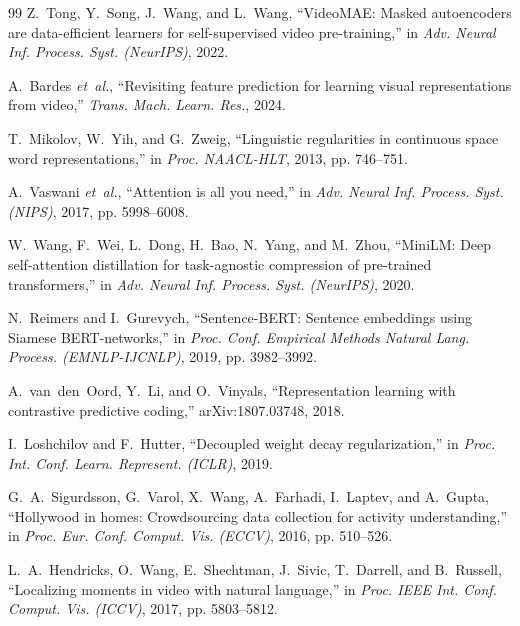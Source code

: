 \documentclass[lettersize,journal]{IEEEtran}
\begin{document}
\begin{thebibliography}{99}
Z.~Tong, Y.~Song, J.~Wang, and L.~Wang, ``VideoMAE: Masked autoencoders are
data-efficient learners for self-supervised video pre-training,'' in
\textit{Adv. Neural Inf. Process. Syst. (NeurIPS)}, 2022.

A.~Bardes \textit{et~al.}, ``Revisiting feature prediction for learning
visual representations from video,'' \textit{Trans. Mach. Learn. Res.}, 2024.

T.~Mikolov, W.~Yih, and G.~Zweig, ``Linguistic regularities in continuous
space word representations,'' in \textit{Proc. NAACL-HLT}, 2013,
pp. 746--751.

A.~Vaswani \textit{et~al.}, ``Attention is all you need,'' in \textit{Adv.
Neural Inf. Process. Syst. (NIPS)}, 2017, pp. 5998--6008.

W.~Wang, F.~Wei, L.~Dong, H.~Bao, N.~Yang, and M.~Zhou, ``MiniLM: Deep
self-attention distillation for task-agnostic compression of pre-trained
transformers,'' in \textit{Adv. Neural Inf. Process. Syst. (NeurIPS)}, 2020.

N.~Reimers and I.~Gurevych, ``Sentence-BERT: Sentence embeddings using
Siamese BERT-networks,'' in \textit{Proc. Conf. Empirical Methods Natural
Lang. Process. (EMNLP-IJCNLP)}, 2019, pp. 3982--3992.

A.~van~den~Oord, Y.~Li, and O.~Vinyals, ``Representation learning with
contrastive predictive coding,'' arXiv:1807.03748, 2018.

I.~Loshchilov and F.~Hutter, ``Decoupled weight decay regularization,'' in
\textit{Proc. Int. Conf. Learn. Represent. (ICLR)}, 2019.

G.~A.~Sigurdsson, G.~Varol, X.~Wang, A.~Farhadi, I.~Laptev, and A.~Gupta,
``Hollywood in homes: Crowdsourcing data collection for activity
understanding,'' in \textit{Proc. Eur. Conf. Comput. Vis. (ECCV)}, 2016,
pp. 510--526.

L.~A.~Hendricks, O.~Wang, E.~Shechtman, J.~Sivic, T.~Darrell, and B.~Russell,
``Localizing moments in video with natural language,'' in \textit{Proc. IEEE
Int. Conf. Comput. Vis. (ICCV)}, 2017, pp. 5803--5812.

\end{thebibliography}
\end{document}
